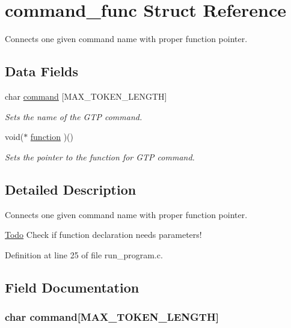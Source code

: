 \hypertarget{structcommand__func}{
\section{command\_\-func Struct Reference}
\label{structcommand__func}
}


Connects one given command name with proper function pointer.  


\subsection*{Data Fields}
\begin{DoxyCompactItemize}
\item 
char \hyperlink{structcommand__func_abd43b5b64c261a18978a168e6c3db44d}{command} \mbox{[}MAX\_\-TOKEN\_\-LENGTH\mbox{]}
\begin{DoxyCompactList}\small\item\em Sets the name of the GTP command. \item\end{DoxyCompactList}\item 
void($\ast$ \hyperlink{structcommand__func_a6922e0c4b7e05be375cde200d2788c89}{function} )()
\begin{DoxyCompactList}\small\item\em Sets the pointer to the function for GTP command. \item\end{DoxyCompactList}\end{DoxyCompactItemize}


\subsection{Detailed Description}
Connects one given command name with proper function pointer. \begin{Desc}
\item[\hyperlink{todo__todo000002}{Todo}]Check if function declaration needs parameters! \end{Desc}


Definition at line 25 of file run\_\-program.c.



\subsection{Field Documentation}
\hypertarget{structcommand__func_abd43b5b64c261a18978a168e6c3db44d}{
\subsubsection[{command}]{\setlength{\rightskip}{0pt plus 5cm}char {\bf command}\mbox{[}MAX\_\-TOKEN\_\-LENGTH\mbox{]}}}
\label{structcommand__func_abd43b5b64c261a18978a168e6c3db44d}


